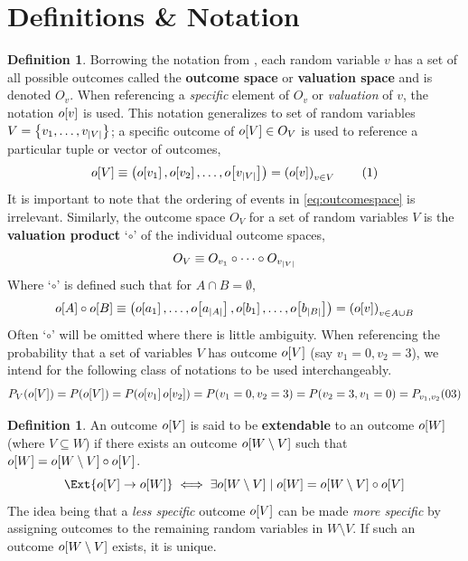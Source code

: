 \documentclass[aps, 10pt, english, twoside, pra, nofootinbib, longbibliography]{revtex4-1}
\theoremstyle{plain}
\theoremstyle{definition}
\newtheorem{definition}[theorem]{Definition}
\theoremstyle{remark}
\newcommand{\valprod}{\circ}
\newcommand{\term}[1]{\textcolor{Mahogany}{\textbf{#1}}}
\newcommand{\outc}[1]{o\!\bs{#1}} %
\begin{document}
    \section{Definitions \& Notation}
    \begin{definition}
        Borrowing the notation from \cite{Fritz_2014}, each random variable $v$ has a set of all possible outcomes called the \term{outcome space} or \term{valuation space} and is denoted $O_v$. When referencing a \textit{specific} element of $O_v$ or \textit{valuation} of $v$, the notation $\outc{v}$ is used. This notation generalizes to set of random variables $V = \left\{ v_1, \ldots, v_{\left| V \right|} \right\}$;
        a specific outcome of $\outc{V} \in O_V$ is used to reference a particular tuple or vector of outcomes,
        \[ \outc{V} \defined \br{\outc{v_1}, \outc{v_2}, \ldots, \outc{v_{\abs{V}}} } = \br{\outc{v}}_{v \in V} \eq \label{eq:outcomespace}\]
        It is important to note that the ordering of events in \cref{eq:outcomespace} is irrelevant. Similarly, the outcome space $O_V$ for a set of random variables $V$ is the \term{valuation product} `$\valprod$' of the individual outcome spaces,
        \[ O_V \defined O_{v_1} \valprod \cdots \valprod O_{v_{\abs{V}}} \]
        Where `$\valprod$' is defined such that for $A \cap B = \emptyset$,
        \[ \outc{A} \valprod \outc{B} \defined \br{\outc{a_1}, \ldots, \outc{a_{\abs{A}}}, \outc{b_1}, \ldots, \outc{b_{\abs{B}}}} = \br{\outc{v}}_{v \in A \cup B} \]
        Often `$\valprod$' will be omitted where there is little ambiguity. When referencing the probability that a set of variables $V$ has outcome $\outc{V}$ (say $v_1 = 0, v_2 = 3$), we intend for the following class of notations to be used interchangeably.
        \[ \prob[V][\outc{V}] = \prob[][\outc{V}] = \prob[][\outc{v_1}\outc{v_2}] = \prob[][v_1 = 0, v_2 = 3] = \prob[][v_2 = 3, v_1 = 0] = \prob[v_1, v_2][03] \]
    \end{definition}

    \begin{definition}
        \label{def:extendable}
        An outcome $\outc{V}$ is said to be \term{extendable} to an outcome $\outc{W}$ (where $V \subseteq W$) if there exists an outcome $\outc{W\setminus V}$ such that $\outc{W} = \outc{W\setminus V} \valprod \outc{V}$.
        \[ \Ext{\outc{V} \to \outc{W}} \iff \exists \outc{W\setminus V} \mid \outc{W} = \outc{W\setminus V} \valprod \outc{V} \]
        The idea being that a \textit{less specific} outcome $\outc{V}$ can be made \textit{more specific} by assigning outcomes to the remaining random variables in $W \setminus V$. If such an outcome $\outc{W\setminus V}$ exists, it is unique.
    \end{definition}
\end{document}
